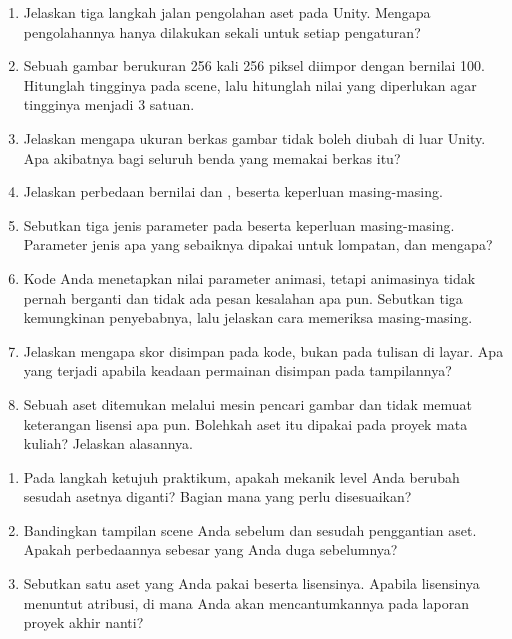 
\begin{enumerate}
  \item Jelaskan tiga langkah jalan pengolahan aset pada Unity. Mengapa
        pengolahannya hanya dilakukan sekali untuk setiap pengaturan?

  \item Sebuah gambar berukuran 256 kali 256 piksel diimpor dengan
         bernilai 100. Hitunglah tingginya pada scene,
        lalu hitunglah nilai yang diperlukan agar tingginya menjadi 3 satuan.

  \item Jelaskan mengapa ukuran berkas gambar tidak boleh diubah di luar
        Unity. Apa akibatnya bagi seluruh benda yang memakai berkas itu?

  \item Jelaskan perbedaan  bernilai  dan
        , beserta keperluan masing-masing.

  \item Sebutkan tiga jenis parameter pada  beserta keperluan
        masing-masing. Parameter jenis apa yang sebaiknya dipakai untuk
        lompatan, dan mengapa?

  \item Kode Anda menetapkan nilai parameter animasi, tetapi animasinya tidak
        pernah berganti dan tidak ada pesan kesalahan apa pun. Sebutkan tiga
        kemungkinan penyebabnya, lalu jelaskan cara memeriksa masing-masing.

  \item Jelaskan mengapa skor disimpan pada kode, bukan pada tulisan di layar.
        Apa yang terjadi apabila keadaan permainan disimpan pada tampilannya?

  \item Sebuah aset ditemukan melalui mesin pencari gambar dan tidak memuat
        keterangan lisensi apa pun. Bolehkah aset itu dipakai pada proyek mata
        kuliah? Jelaskan alasannya.
\end{enumerate}

\begin{refleksibox}
\begin{enumerate}
  \item Pada langkah ketujuh praktikum, apakah mekanik level Anda berubah
        sesudah asetnya diganti? Bagian mana yang perlu disesuaikan?

  \item Bandingkan tampilan scene Anda sebelum dan sesudah penggantian aset.
        Apakah perbedaannya sebesar yang Anda duga sebelumnya?

  \item Sebutkan satu aset yang Anda pakai beserta lisensinya. Apabila
        lisensinya menuntut atribusi, di mana Anda akan mencantumkannya pada
        laporan proyek akhir nanti?
\end{enumerate}
\end{refleksibox}
